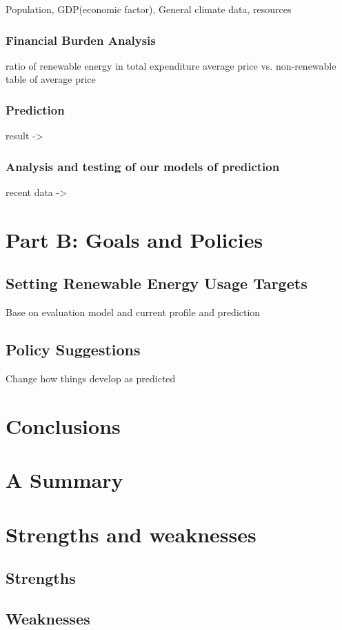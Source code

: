 \documentclass{mcmthesis}
\begin{document}
		Population, GDP(economic factor), General climate data, resources
	\subsubsection{Financial Burden Analysis}
		ratio of renewable energy in total expenditure
		average price vs. non-renewable
		table of average price
	\subsubsection{Prediction}
		result ->
	\subsubsection{Analysis and testing of our models of prediction}
		recent data ->
		
\section{Part B: Goals and Policies}
\subsection{Setting Renewable Energy Usage Targets}
	Base on evaluation model and current profile and prediction
	
\subsection{Policy Suggestions}
	Change how things develop as predicted

\section{Conclusions}

\section{A Summary}

\section{Strengths and weaknesses}

\subsection{Strengths}
\subsection{Weaknesses}
\end{document}
